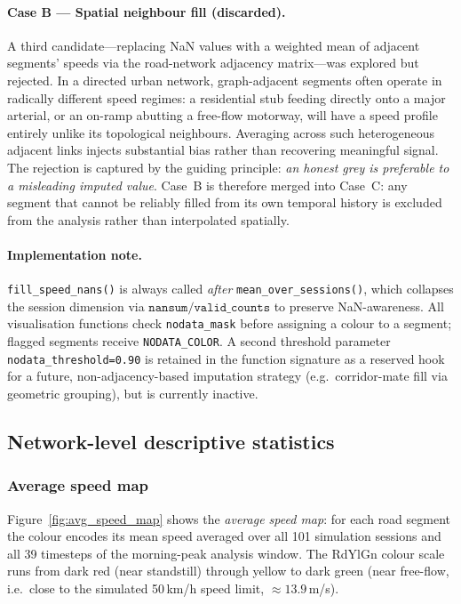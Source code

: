 \documentclass[11pt,a4paper]{article}
\begin{document}
\paragraph{Case B --- Spatial neighbour fill (discarded).}
A third candidate---replacing NaN values with a weighted mean of adjacent
segments' speeds via the road-network adjacency matrix---was explored but
rejected.  In a directed urban network, graph-adjacent segments often
operate in radically different speed regimes: a residential stub feeding
directly onto a major arterial, or an on-ramp abutting a free-flow motorway,
will have a speed profile entirely unlike its topological neighbours.
Averaging across such heterogeneous adjacent links injects substantial bias
rather than recovering meaningful signal.  The rejection is captured by the
guiding principle: \emph{an honest grey is preferable to a misleading
imputed value}.  Case~B is therefore merged into Case~C: any segment that
cannot be reliably filled from its own temporal history is excluded from the
analysis rather than interpolated spatially.

\paragraph{Implementation note.}
\texttt{fill\_speed\_nans()} is always called \emph{after}
\texttt{mean\_over\_sessions()}, which collapses the session dimension via
$\texttt{nansum} / \texttt{valid\_counts}$ to preserve NaN-awareness.  All
visualisation functions check \texttt{nodata\_mask} before assigning a colour
to a segment; flagged segments receive \texttt{NODATA\_COLOR}.  A second
threshold parameter \texttt{nodata\_threshold=0.90} is retained in the
function signature as a reserved hook for a future, non-adjacency-based
imputation strategy (e.g.\ corridor-mate fill via geometric grouping), but
is currently inactive.

\subsection{Network-level descriptive statistics}
\label{sec:data:stats}

\subsubsection{Average speed map}
\label{sec:data:stats:avgmap}

Figure~\ref{fig:avg_speed_map} shows the \emph{average speed map}: for each
road segment the colour encodes its mean speed averaged over all 101
simulation sessions and all 39 timesteps of the morning-peak analysis window.
The RdYlGn colour scale runs from dark red (near standstill) through yellow
to dark green (near free-flow, i.e.\ close to the simulated 50\,km/h speed
limit, $\approx 13.9$\,m/s).
\end{document}
